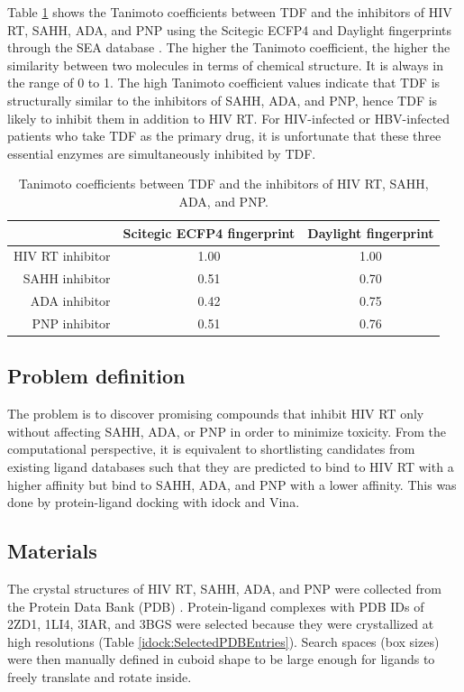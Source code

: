 Table \ref{idock:TanimotoCoefficients} shows the Tanimoto coefficients between TDF and the inhibitors of HIV RT, SAHH, ADA, and PNP using the Scitegic ECFP4 and Daylight fingerprints through the SEA database \citep{380}. The higher the Tanimoto coefficient, the higher the similarity between two molecules in terms of chemical structure. It is always in the range of 0 to 1. The high Tanimoto coefficient values indicate that TDF is structurally similar to the inhibitors of SAHH, ADA, and PNP, hence TDF is likely to inhibit them in addition to HIV RT. For HIV-infected or HBV-infected patients who take TDF as the primary drug, it is unfortunate that these three essential enzymes are simultaneously inhibited by TDF.

\begin{table}
\centering
\begin{tabular*}
{\linewidth}
{@{\extracolsep{\fill}}rcc}
\toprule
& Scitegic ECFP4 fingerprint & Daylight fingerprint\\
\midrule
HIV RT inhibitor & 1.00 & 1.00 \\
  SAHH inhibitor & 0.51 & 0.70 \\
   ADA inhibitor & 0.42 & 0.75 \\
   PNP inhibitor & 0.51 & 0.76 \\
\bottomrule
\end{tabular*}
\caption{Tanimoto coefficients between TDF and the inhibitors of HIV RT, SAHH, ADA, and PNP.}
\label{idock:TanimotoCoefficients}
\end{table}

\subsection{Problem definition}

The problem is to discover promising compounds that inhibit HIV RT only without affecting SAHH, ADA, or PNP in order to minimize toxicity. From the computational perspective, it is equivalent to shortlisting candidates from existing ligand databases such that they are predicted to bind to HIV RT with a higher affinity but bind to SAHH, ADA, and PNP with a lower affinity. This was done by protein-ligand docking with idock and Vina.

\subsection{Materials}

The crystal structures of HIV RT, SAHH, ADA, and PNP were collected from the Protein Data Bank (PDB) \citep{539,537}. Protein-ligand complexes with PDB IDs of 2ZD1, 1LI4, 3IAR, and 3BGS were selected because they were crystallized at high resolutions (Table \ref{idock:SelectedPDBEntries}). Search spaces (box sizes) were then manually defined in cuboid shape to be large enough for ligands to freely translate and rotate inside.


